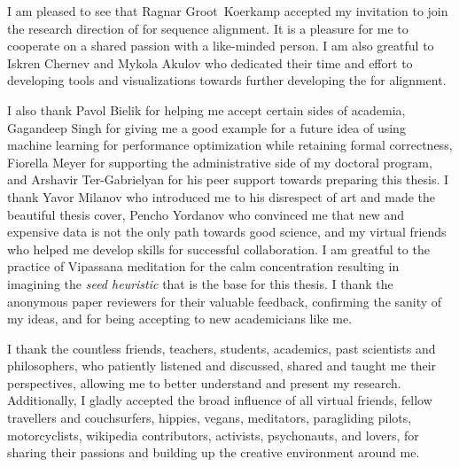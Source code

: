 I am pleased to see that Ragnar Groot~Koerkamp accepted my invitation to join
the research direction of \A for sequence alignment. It is a pleasure for me to
cooperate on a shared passion with a like-minded person. I am also greatful to
Iskren Chernev and Mykola Akulov who dedicated their time and effort to
developing tools and visualizations towards further developing the \A for
alignment.

I also thank Pavol Bielik for helping me accept certain sides of academia,
Gagandeep Singh for giving me a good example for a future idea of using machine
learning for performance optimization while retaining formal correctness,
Fiorella Meyer for supporting the administrative side of my doctoral program,
and Arshavir Ter-Gabrielyan for his peer support towards preparing this thesis.
I thank Yavor Milanov who introduced me to his disrespect of art and made the
beautiful thesis cover, Pencho Yordanov who convinced me that new and expensive
data is not the only path towards good science, and my virtual friends who
helped me develop skills for successful collaboration. I am greatful to the
practice of Vipassana meditation for the calm concentration resulting in
imagining the \emph{seed heuristic} that is the base for this thesis. I thank
the anonymous paper reviewers for their valuable feedback, confirming the sanity
of my ideas, and for being accepting to new academicians like me. 

I thank the countless friends, teachers, students, academics, past scientists
and philosophers, who patiently listened and discussed, shared and taught me
their perspectives, allowing me to better understand and present my research.
Additionally, I gladly accepted the broad influence of all virtual friends,
fellow travellers and couchsurfers, hippies, vegans, meditators, paragliding
pilots, motorcyclists, wikipedia contributors, activists, psychonauts, and
lovers, for sharing their passions and building up the creative environment
around me.

\endgroup
